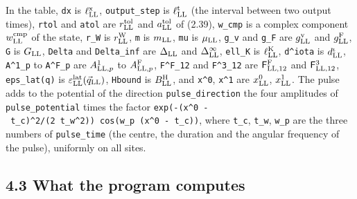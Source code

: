 \documentclass[
  10pt,
]{article}
\begin{document}
In the table, \texttt{dx} is \(\ell^{\rm x}_{\rm LL}\),
\texttt{output\_step} is \(\ell^{\rm t}_{\rm LL}\) (the interval between
two output times), \texttt{rtol} and \texttt{atol} are
\(r^{\rm tol}_{\rm LL}\) and \(a^{\rm tol}_{\rm LL}\) of (2.39),
\texttt{w\_cmp} is a complex component \(w^{\rm cmp}_{\rm LL}\) of the
state, \texttt{r\_W} is \(r^{\rm W}_{\rm LL}\), \texttt{m} is
\(m_{\rm LL}\), \texttt{mu} is \(\mu_{\rm LL}\), \texttt{g\_v} and
\texttt{g\_F} are \(g^{\rm v}_{\rm LL}\) and \(g^{\rm F}_{\rm LL}\),
\texttt{G} is \(G_{\rm LL}\), \texttt{Delta} and \texttt{Delta\_inf} are
\(\Delta_{\rm LL}\) and \(\Delta^\infty_{\rm LL}\), \texttt{ell\_K} is
\(\ell^{\rm K}_{\rm LL}\), \texttt{d\^{}iota} is \(d^\iota_{\rm LL}\),
\texttt{A\^{}1\_p} to \texttt{A\^{}F\_p} are \(A^1_{{\rm LL},p}\) to
\(A^{\rm F}_{{\rm LL},p}\), \texttt{F\^{}F\_12} and \texttt{F\^{}3\_12}
are \(\mathsf F^{\rm F}_{{\rm LL},12}\) and
\(\mathsf F^3_{{\rm LL},12}\), \texttt{eps\_lat(q)} is
\(\varepsilon^{\rm lat}_{\rm LL}(\vec q_{\rm LL})\), \texttt{Hbound} is
\(B^{\rm H}_{\rm LL}\), and \texttt{x\^{}0}, \texttt{x\^{}1} are
\(x^0_{\rm LL}\), \(x^1_{\rm LL}\). The pulse adds to the potential of
the direction \texttt{pulse\_direction} the four amplitudes of
\texttt{pulse\_potential} times the factor
\texttt{exp(-(x\^{}0\ -\ t\_c)\^{}2/(2\ t\_w\^{}2))\ cos(w\_p\ (x\^{}0\ -\ t\_c))},
where \texttt{t\_c}, \texttt{t\_w}, \texttt{w\_p} are the three numbers
of \texttt{pulse\_time} (the centre, the duration and the angular
frequency of the pulse), uniformly on all sites.

\hypertarget{what-the-program-computes}{%
\subsection{4.3 What the program
computes}\label{what-the-program-computes}}
\end{document}
